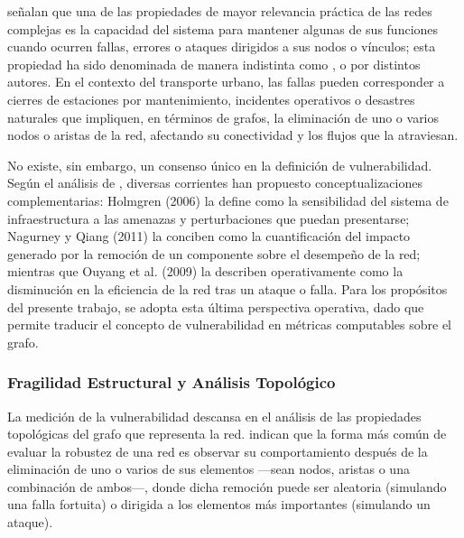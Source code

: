 \citet{loterovélez2014} señalan que una de las propiedades de mayor
relevancia
práctica de las redes complejas es la capacidad del sistema para mantener
algunas
de sus funciones cuando ocurren fallas, errores o ataques dirigidos a sus nodos
o
vínculos; esta propiedad ha sido denominada de manera indistinta como
,  o  por
distintos
autores. En el contexto del transporte urbano, las fallas pueden corresponder a
cierres de estaciones por mantenimiento, incidentes operativos o desastres
naturales que impliquen, en términos de grafos, la eliminación de uno o varios
nodos
o aristas de la red, afectando su conectividad y los flujos que la atraviesan.
 
No existe, sin embargo, un consenso único en la definición de vulnerabilidad.
Según
el análisis de \citet{loterovélez2014}, diversas corrientes han propuesto
conceptualizaciones complementarias: Holmgren (2006) la define como la
sensibilidad del sistema de infraestructura a las amenazas y perturbaciones que
puedan presentarse; Nagurney y Qiang (2011) la conciben como la cuantificación
del impacto generado por la remoción de un componente sobre el desempeño de la
red; mientras que Ouyang et al. (2009) la describen operativamente como la
disminución en la eficiencia de la red tras un ataque o falla. Para los
propósitos del
presente trabajo, se adopta esta última perspectiva operativa, dado que permite
traducir el concepto de vulnerabilidad en métricas computables sobre el grafo.

\subsubsection{Fragilidad Estructural y Análisis Topológico}
\label{subsubsec:fragilidad-estructural}
 
La medición de la vulnerabilidad descansa en el análisis de las propiedades
topológicas del grafo que representa la red. \citet{loterovélez2014} indican
que
la forma más común de evaluar la robustez de una red es observar su
comportamiento
después de la eliminación de uno o varios de sus elementos ---sean nodos,
aristas o
una combinación de ambos---, donde dicha remoción puede ser aleatoria (simulando
una falla fortuita) o dirigida a los elementos más importantes (simulando un
ataque).
 
